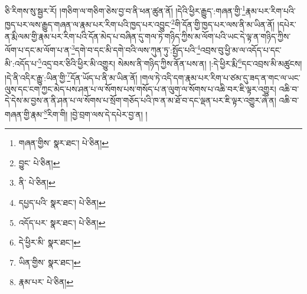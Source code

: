 ཅི་རིགས་སུ་སྦྱར་རོ། །གཅིག་ལ་གཅིག་ཅེས་བྱ་བ་ནི་ཕན་ཚུན་ནོ། །དེའི་ཕྱིར་རྒྱུད་:གཞན་གྱི་\footnote{གཞན་གྱིས་  སྣར་ཐང་།  པེ་ཅིན། }རྣམ་པར་རིག་པའི་ཁྱད་པར་ལས་རྒྱུད་གཞན་ལ་རྣམ་པར་རིག་པའི་ཁྱད་པར་འབྱུང་\footnote{བྱུང་  པེ་ཅིན། }གི་དོན་གྱི་ཁྱད་པར་ལས་ནི་མ་ཡིན་ནོ། །དཔེར་ན་རྨི་ལམ་གྱི་རྣམ་པར་རིག་པའི་དོན་མེད་པ་བཞིན་དུ་གལ་ཏེ་གཉིད་ཀྱིས་མ་ལོག་པའི་ཡང་དེ་ལྟ་ན་གཉིད་ཀྱིས་ལོག་པ་དང་མ་ལོག་པ་ན་\footnote{ནི་  པེ་ཅིན། }དགེ་བ་དང་མི་དགེ་བའི་ལས་ཀུན་ཏུ་:སྤྱོད་པའི་\footnote{དཔྱད་པའི་  སྣར་ཐང་།  པེ་ཅིན། }འབྲས་བུ་ཕྱི་མ་ལ་འདོད་པ་དང་མི་:འདོད་པ་\footnote{འདོད་པར་  སྣར་ཐང་།  པེ་ཅིན། }འདྲ་བར་ཅིའི་ཕྱིར་མི་འགྱུར། སེམས་ནི་གཉིད་ཀྱིས་ནོན་པས་ན། །:དེ་ཕྱིར་རྨི་\footnote{དེ་ཕྱིར་མི་  སྣར་ཐང་། }དང་འབྲས་མི་མཚུངས། །དེ་ནི་འདིར་རྒྱུ་:ཡིན་གྱི་\footnote{ཡིན་གྱིས་  སྣར་ཐང་། }དོན་ཡོད་པ་ནི་མ་ཡིན་ནོ། །གལ་ཏེ་འདི་དག་རྣམ་པར་རིག་པ་ཙམ་དུ་ཟད་ན་གང་ལ་ཡང་ལུས་དང་ངག་ཀྱང་མེད་པས་ཤན་པ་ལ་སོགས་པས་གསོད་པ་ན་ལུག་ལ་སོགས་པ་འཆི་བར་ཇི་ལྟར་འགྱུར། འཆི་བ་དེ་དེས་མ་བྱས་ན་ནི་ཤན་པ་ལ་སོགས་པ་སྲོག་གཅོད་པའི་ཁ་ན་མ་ཐོ་བ་དང་ལྡན་པར་ཇི་ལྟར་འགྱུར་ཞེ་ན། འཆི་བ་གཞན་གྱི་རྣམ་\footnote{རྣམ་པར་  པེ་ཅིན། }རིག་གི། །བྱེ་བྲག་ལས་དེ་དཔེར་བྱ་ན། །
